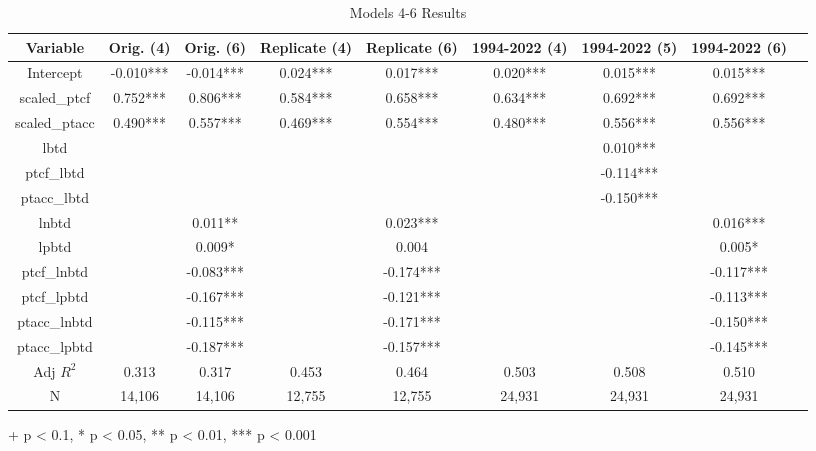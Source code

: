 \documentclass[12pt]{article}
\begin{document}
\begin{table}[htbp]
\centering
\caption{Models 4-6 Results}
\label{tab:Models_4_6_Results}
\begin{adjustbox}{max width=\textwidth}
\begin{tabular}{|c|c|c|c|c|c|c|c|c|}
\hline
Variable & Orig. (4) & Orig. (6) & Replicate (4) & Replicate (6) & 1994-2022 (4) & 1994-2022 (5) & 1994-2022 (6) \\
\hline
Intercept & -0.010*** & -0.014*** & 0.024*** & 0.017*** & 0.020*** & 0.015*** & 0.015*** \\
scaled\_ptcf & 0.752*** & 0.806*** & 0.584*** & 0.658*** & 0.634*** & 0.692*** & 0.692*** \\
scaled\_ptacc & 0.490*** & 0.557*** & 0.469*** & 0.554*** & 0.480*** & 0.556*** & 0.556*** \\
lbtd &  &  &  &  &  & 0.010*** & \\
ptcf\_lbtd &  &  &  &  &  & -0.114*** &  \\
ptacc\_lbtd &  &  &  &  &  & -0.150*** &  \\
lnbtd &  & 0.011** &  & 0.023*** &  &  & 0.016*** \\
lpbtd &  & 0.009* &  & 0.004 &  &  & 0.005* \\
ptcf\_lnbtd &  & -0.083*** &  & -0.174*** &  &  & -0.117*** \\
ptcf\_lpbtd &  & -0.167*** &  & -0.121*** &  &  & -0.113*** \\
ptacc\_lnbtd &  & -0.115*** &  & -0.171*** &  &  & -0.150*** \\
ptacc\_lpbtd &  & -0.187*** &  & -0.157*** &  &  & -0.145*** \\
\hline
Adj $R^2$ & 0.313 & 0.317 & 0.453 & 0.464 & 0.503 & 0.508 & 0.510 \\
\hline
N & 14,106 & 14,106 & 12,755 & 12,755 & 24,931 & 24,931 & 24,931 \\
\hline
\end{tabular}
\end{adjustbox}
\footnotesize{+ p < 0.1, * p < 0.05, ** p < 0.01, *** p < 0.001}
\end{table}
\end{document}
